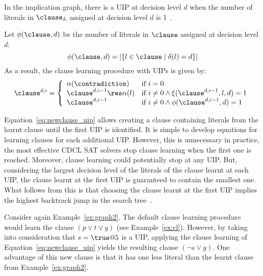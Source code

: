 In the implication graph, there is a UIP at decision level $d$ when the number
of literals in $\clause_L$ assigned at decision level $d$ is
1~\cite{cdclchapter}. 

\begin{definition}
    Let $\phi(\clause,d)$ be the number of literals in $\clause$ assigned at
    decision level $d$:
    \begin{equation}
        \phi(\clause,d) = |\{l \in \clause\;|\;\delta(l) = d\}|
    \end{equation}
    As a result, the clause learning procedure with UIPs is given by:
    \begin{equation}%
        \label{eq:newclause_uip}
        \clause^{d,i} = 
        \left\{
            \begin{array}{ll}
                \alpha(\contradiction) & \text{if $i=0$}\\
                \clause^{d,i-1} \res \alpha(l) & \text{if $i \neq 0 \land \xi(\clause^{d,i-1}, l, d) = 1$}\\
                \clause^{d, i-1} & \text{if $i \neq 0 \land \phi(\clause^{d,i-1}, d) = 1$}
            \end{array}
        \right.
    \end{equation}
\end{definition}

Equation~\ref{eq:newclause_uip} allows creating a clause containing literals
from the learnt clause until the first UIP is identified. It is simple to
develop equations for learning clauses for each additional UIP\@. However, this
is unnecessary in practice, the most effective CDCL SAT solvers stop
clause learning when the first one is reached. Moreover, clause learning could
potentially stop at any UIP\@. But, considering the largest decision level of the
literals of the clause learnt at each UIP, the clause learnt at the first UIP is
guaranteed to contain the smallest one. What follows from this is that choosing
the clause learnt at the first UIP implies the highest backtrack jump in the
search tree~\cite{cdclchapter}. 

\begin{example}
    Consider again Example~\ref{ex:graph2}. The default clause learning
    procedure would learn the clause $(p \lor t \lor y)$ (see
    Example~\ref{ex:cl}). However, by taking into consideration that $s =
    \true @5$ is a UIP, applying the clause learning of
    Equation~\ref{eq:newclause_uip} yields the resulting clause $(\neg s \lor
    y)$. One advantage of this new clause is that it has one less literal than
    the learnt clause from Example~\ref{ex:graph2}.
\end{example}

